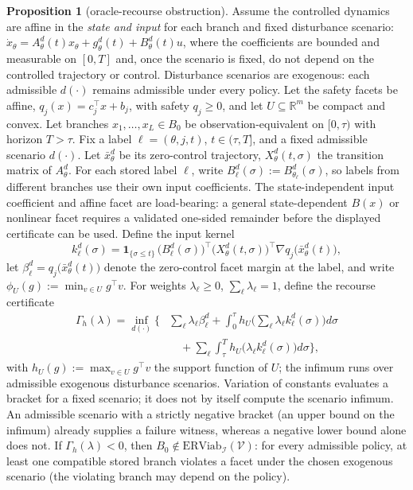 \documentclass[10pt,twocolumn]{article}
\theoremstyle{definition}
\newtheorem{proposition}{Proposition}
\begin{document}
\begin{proposition}[oracle-recourse obstruction]\label{calc-prop:recourse}
Assume the controlled dynamics are affine in the \emph{state and input}
for each branch and fixed disturbance scenario:
\(\dot x_\theta = A_\theta^d(t)x_\theta + g_\theta^d(t)
+ B_\theta^d(t)u\), where the coefficients are bounded and measurable
on \([0,T]\) and, once the scenario is fixed, do not depend on the
controlled trajectory or control. Disturbance scenarios are exogenous:
each admissible \(d(\cdot)\) remains admissible under every policy.
Let the safety facets be affine,
\(q_j(x)=c_j^\top x+b_j\), with safety \(q_j\ge0\), and let
\(U\subseteq\mathbb{R}^m\) be compact and convex. Let branches
\(x_1,\dots,x_L\in B_0\) be observation-equivalent on \([0,\tau)\)
with horizon \(T>\tau\). Fix a label
\(\ell=(\theta,j,t)\), \(t\in(\tau,T]\), and a fixed admissible
scenario \(d(\cdot)\). Let \(\bar x_\theta^d\) be its zero-control
trajectory, \(X_\theta^d(t,\sigma)\) the transition matrix of
\(A_\theta^d\). For each stored label \(\ell\), write
\(B_\ell^d(\sigma):=B_{\theta_\ell}^d(\sigma)\), so labels from
different branches use their own input coefficients.
The state-independent input coefficient and affine facet are
load-bearing: a general state-dependent \(B(x)\) or nonlinear facet
requires a validated one-sided remainder before the displayed certificate
can be used.
Define the input kernel
\[k_\ell^d(\sigma) = \mathbf{1}_{\{\sigma \le t\}}\,
\big(B_\ell^d(\sigma)\big)^{\top}
\big(X_\theta^d(t, \sigma)\big)^{\top}
\nabla q_j\big(\bar x_\theta^d(t)\big),\]
let \(\beta_\ell^d = q_j\big(\bar x_\theta^d(t)\big)\) denote the
zero-control facet margin at the label, and write
\(\phi_U(g) := \min_{v \in U} g^{\top} v\). For weights
\(\lambda_\ell \ge 0\), \(\sum_\ell \lambda_\ell = 1\), define the recourse certificate \[\begin{aligned} \Gamma_{h}(\lambda) = \inf_{d(\cdot)} \Big\{ &\sum_{\ell} \lambda_{\ell} \beta_{\ell}^{d} + \int_0^{\tau} h_U\Big(\sum_{\ell} \lambda_\ell k_\ell^d(\sigma)\Big) d\sigma \\ &\quad + \sum_{\ell} \int_{\tau}^{T} h_U\big(\lambda_\ell k_\ell^d(\sigma)\big) d\sigma \Big\}, \end{aligned}\] with \(h_U(g) := \max_{v \in U} g^{\top} v\) the support function of \(U\); the infimum runs over admissible exogenous disturbance scenarios. Variation of constants evaluates a bracket for a fixed scenario; it does not by itself compute the scenario infimum. An admissible scenario with a strictly negative bracket (an upper bound on the infimum) already supplies a failure witness, whereas a negative lower bound alone does not. If \(\Gamma_{h}(\lambda) < 0\), then \(B_0 \notin \mathrm{ERViab}_{\mathcal{I}}(\mathcal{V})\): for every admissible policy, at least one compatible stored branch violates a facet under the chosen exogenous scenario (the violating branch may depend on the policy).
\end{proposition}
\end{document}
